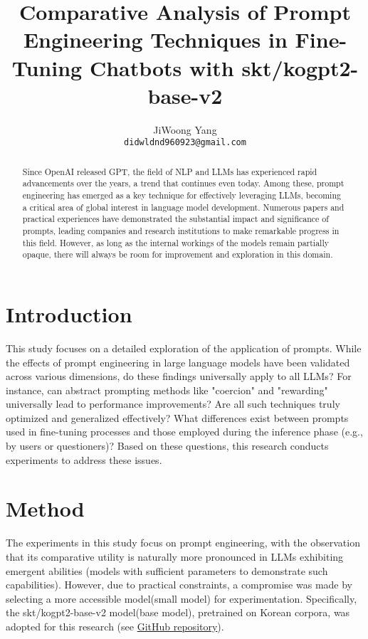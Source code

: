 \documentclass[11pt]{article}
\title{Comparative Analysis of Prompt Engineering Techniques in Fine-Tuning Chatbots with skt/kogpt2-base-v2}
\author{JiWoong Yang \\
  \texttt{didwldnd960923@gmail.com} \\}
\begin{document}
\maketitle

\begin{abstract}
Since OpenAI released GPT, the field of NLP and LLMs has experienced rapid advancements over the years, a trend that continues even today. Among these, prompt engineering has emerged as a key technique for effectively leveraging LLMs, becoming a critical area of global interest in language model development. Numerous papers and practical experiences have demonstrated the substantial impact and significance of prompts, leading companies and research institutions to make remarkable progress in this field. However, as long as the internal workings of the models remain partially opaque, there will always be room for improvement and exploration in this domain.
\end{abstract}

\section{Introduction}

This study focuses on a detailed exploration of the application of prompts. While the effects of prompt engineering in large language models have been validated across various dimensions, do these findings universally apply to all LLMs? For instance, can abstract prompting methods like "coercion" and "rewarding" universally lead to performance improvements? Are all such techniques truly optimized and generalized effectively? What differences exist between prompts used in fine-tuning processes and those employed during the inference phase (e.g., by users or questioners)? Based on these questions, this research conducts experiments to address these issues.

\section{Method}

The experiments in this study focus on prompt engineering, with the observation that its comparative utility is naturally more pronounced in LLMs exhibiting emergent abilities (models with sufficient parameters to demonstrate such capabilities). However, due to practical constraints, a compromise was made by selecting a more accessible model(small model) for experimentation. Specifically, the skt/kogpt2-base-v2 model(base model), pretrained on Korean corpora, was adopted for this research (see \href{https://github.com/airobotlab/KoChatGPT/tree/main}{GitHub repository}).
\end{document}
